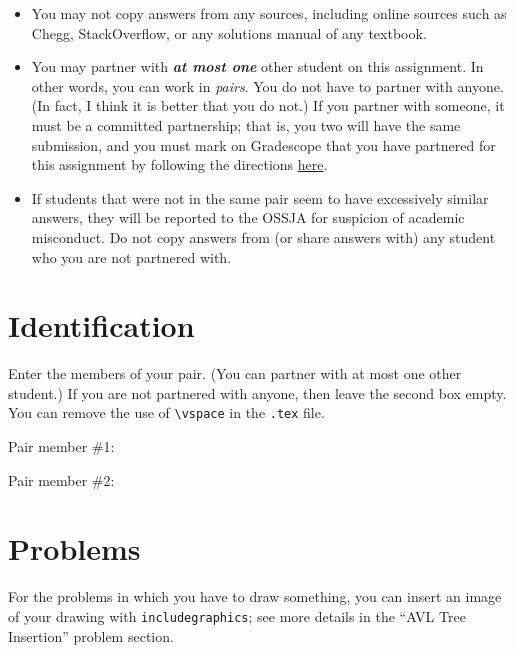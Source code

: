 \documentclass{article}
\begin{document}
\begin{itemize}[itemsep=0mm, parsep=0pt]
\item You may not copy answers from any sources, including online sources such as Chegg, StackOverflow, or any solutions manual of any textbook.
\item You may partner with \textbf{\textit{at most one}} other student on this assignment. In other words, you can work in \textit{pairs}. You do not have to partner with anyone. (In fact, I think it is better that you do not.) If you partner with someone, it must be a committed partnership; that is, you two will have the same submission, and you must mark on Gradescope that you have partnered for this assignment by following the directions \href{https://www.youtube.com/watch?v=rue7p_kATLA}{here}.
\item If students that were not in the same pair seem to have excessively similar answers, they will be reported to the OSSJA for suspicion of academic misconduct. Do not copy answers from (or share answers with) any student who you are not partnered with.
\end{itemize}

\section{Identification}

Enter the members of your pair. (You can partner with at most one other student.) If you are not partnered with anyone, then leave the second box empty. You can remove the use of \lstinline{\vspace} in the \lstinline{.tex} file.

Pair member \#1:

\begin{mdframed}
\vspace{3em}
\end{mdframed}

Pair member \#2:

\begin{mdframed}
\vspace{3em}
\end{mdframed}

\section{Problems}

For the problems in which you have to draw something, you can insert an image of your drawing with \lstinline{includegraphics}; see more details in the ``AVL Tree Insertion'' problem section.
\end{document}
